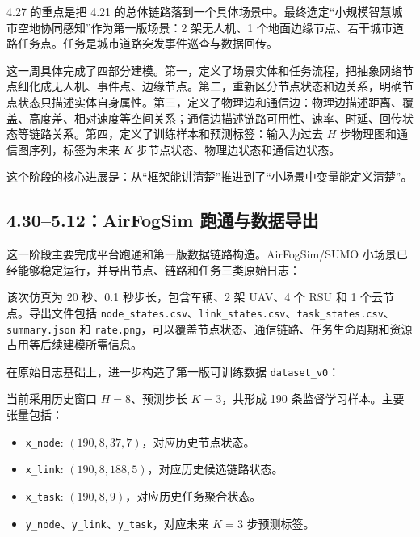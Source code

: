 ﻿\documentclass[UTF8,a4paper,11pt]{ctexart}
\newcommand{\code}[1]{\texttt{#1}}
\begin{document}
4.27 的重点是把 4.21 的总体链路落到一个具体场景中。最终选定“小规模智慧城市空地协同感知”作为第一版场景：2 架无人机、1 个地面边缘节点、若干城市道路任务点。任务是城市道路突发事件巡查与数据回传。

这一周具体完成了四部分建模。第一，定义了场景实体和任务流程，把抽象网络节点细化成无人机、事件点、边缘节点。第二，重新区分节点状态和边关系，明确节点状态只描述实体自身属性。第三，定义了物理边和通信边：物理边描述距离、覆盖、高度差、相对速度等空间关系；通信边描述链路可用性、速率、时延、回传状态等链路关系。第四，定义了训练样本和预测标签：输入为过去 $H$ 步物理图和通信图序列，标签为未来 $K$ 步节点状态、物理边状态和通信边状态。

这个阶段的核心进展是：从“框架能讲清楚”推进到了“小场景中变量能定义清楚”。

\subsection{4.30--5.12：AirFogSim 跑通与数据导出}

这一阶段主要完成平台跑通和第一版数据链路构造。AirFogSim/SUMO 小场景已经能够稳定运行，并导出节点、链路和任务三类原始日志：

\begin{center}
\end{center}

该次仿真为 20 秒、0.1 秒步长，包含车辆、2 架 UAV、4 个 RSU 和 1 个云节点。导出文件包括 \code{node\_states.csv}、\code{link\_states.csv}、\code{task\_states.csv}、\code{summary.json} 和 \code{rate.png}，可以覆盖节点状态、通信链路、任务生命周期和资源占用等后续建模所需信息。

在原始日志基础上，进一步构造了第一版可训练数据 \code{dataset\_v0}：

\begin{center}
\end{center}

当前采用历史窗口 $H=8$、预测步长 $K=3$，共形成 190 条监督学习样本。主要张量包括：

\begin{itemize}
  \item \code{x\_node}: $(190,8,37,7)$，对应历史节点状态。
  \item \code{x\_link}: $(190,8,188,5)$，对应历史候选链路状态。
  \item \code{x\_task}: $(190,8,9)$，对应历史任务聚合状态。
  \item \code{y\_node}、\code{y\_link}、\code{y\_task}，对应未来 $K=3$ 步预测标签。
\end{itemize}
\end{document}
